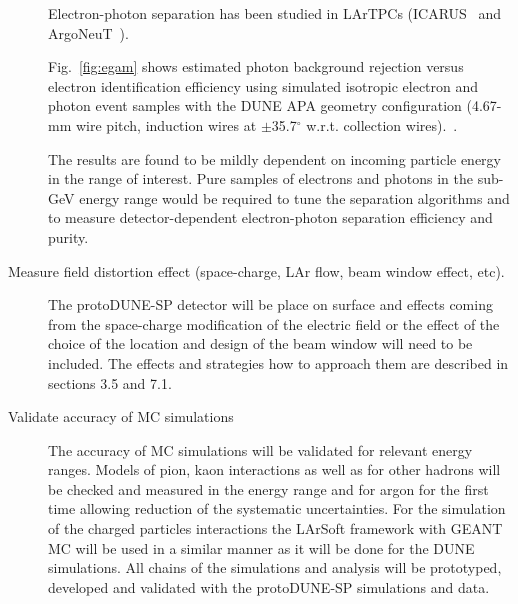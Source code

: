 \begin{description}
Electron-photon separation has been studied in LArTPCs (ICARUS~\cite{icarus_eg} and ArgoNeuT~\cite{argoneut_eg}).

Fig.~\ref{fig:egam}  shows estimated photon background rejection versus electron identification efficiency using 
simulated isotropic electron and photon event samples  with the DUNE APA geometry configuration (4.67-mm wire pitch, induction wires at $\pm$35.7$^{\circ}$ w.r.t. collection wires).~\cite{dunecdr}. 

The results are found to be mildly dependent on incoming particle energy in the range of interest. 
Pure samples of electrons and photons in the sub-GeV energy range would be
required to tune the separation algorithms and to measure 
detector-dependent electron-photon separation efficiency and purity. 


\item [Measure field distortion effect (space-charge, LAr flow, beam window effect, etc).] 

The protoDUNE-SP detector will be place on surface and effects coming from the space-charge modification of the electric field or the effect of the choice of the location and design of the beam window will need to be included. The effects and strategies how to approach them are described in sections 3.5 and 7.1.


\item [Validate accuracy of MC simulations] The accuracy of MC simulations will be validated for relevant energy ranges. Models of pion, kaon interactions as well as for other hadrons will be checked and measured in the energy range and for argon for the first time allowing reduction of the systematic uncertainties. For the simulation of the charged particles interactions the LArSoft framework with GEANT MC will be used in a similar   manner as it will be done for the DUNE simulations. All chains of the simulations and analysis will be prototyped, developed and validated with the protoDUNE-SP simulations and data. 
\end{description}


